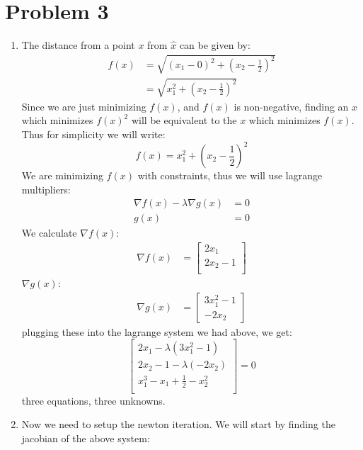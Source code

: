 \documentclass{article}
\begin{document}
\section*{Problem 3}
\begin{enumerate}[label=\alph*.)]
\item The distance from a point $x$ from $\hat{x}$ can be given by: \\
\begin{align*}
f(x) &= \sqrt{(x_1 -  0)^2 + (x_2 - \frac{1}{2})^2}\\
&= \sqrt{x_1^2 + (x_2 - \frac{1}{2})^2}
\end{align*}
Since we are just minimizing $f(x)$, and $f(x)$ is non-negative, finding an $x$ which minimizes $f(x)^2$ will be equivalent to the $x$ which minimizes $f(x)$. Thus for simplicity we will write:\\
\[
f(x) = x_1^2 + (x_2 - \frac{1}{2})^2
\]
We are minimizing $f(x)$ with constraints, thus we will use lagrange multipliers:\\
\begin{align*}
\nabla f(x) - \lambda \nabla g(x) &= 0 \\
g(x) &= 0
\end{align*}
We calculate $\nabla f(x)$: \\
\begin{align*}
\nabla f(x) &= \begin{bmatrix}
2x_1 \\
2x_2 - 1 \\
\end{bmatrix}
\end{align*}
$\nabla g(x)$: \\
\begin{align*}
\nabla g(x) &= \begin{bmatrix}
3x_1^2 - 1 \\
-2x_2
\end{bmatrix}
\end{align*}
plugging these into the lagrange system we had above, we get: \\
\[
\begin{bmatrix}
2x_1 - \lambda(3x_1^2 - 1) \\
2x_2 - 1 - \lambda(-2x_2) \\
x_1^3 - x_1 + \frac{1}{2} - x_2^2 \\
\end{bmatrix} = 0
\]
three equations, three unknowns. \\
\item Now we need to setup the newton iteration. We will start by finding the jacobian of the above system: \\

\end{enumerate}
\end{document}
